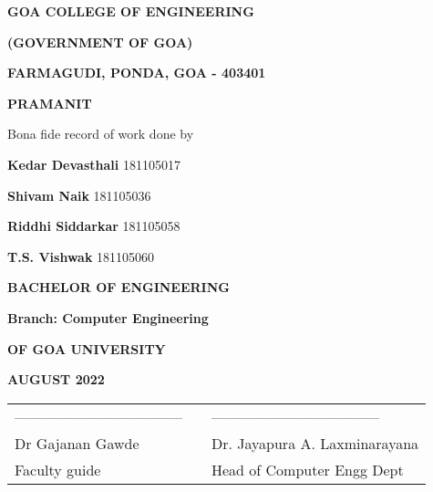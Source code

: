     \thispagestyle{empty}
    \begin{center}
        {\Large \textbf{GOA COLLEGE OF ENGINEERING} \par}
        {\textbf{(GOVERNMENT OF GOA)} \par}
        {\Large \textbf{FARMAGUDI, PONDA, GOA - 403401} \par}
    \vspace{1cm}

    {\uppercase{\Huge \textbf {PRAMANIT}}
\par}
        \vspace{1cm} {\large { Bona fide record of work done by} \par }
    \vspace{1cm}
        {\Large{ \textbf{ Kedar Devasthali } 181105017}\par }
        {\Large \textbf{ Shivam Naik }181105036 \par}
        {\Large \textbf{ Riddhi  Siddarkar }181105058 \par}
        {\Large \textbf{ T.S. Vishwak }181105060 \par}
        \vspace{0.5cm}
        
    \end{center}
        { \par }
        \begin{center}
            
        {\Large \textbf{BACHELOR OF ENGINEERING}\par}
        {\Large \textbf{Branch: Computer Engineering}\par}
        {\Large \textbf {OF GOA UNIVERSITY}\par}
        {\Large \textbf{AUGUST 2022}\par}
        \vspace{1.5cm}
        

    \end{center}
    \begin{table}[H]
        \begin{center}
    \begin{tabular}{lcl}
        \noindent ----------------------------------- &\hspace{1cm}&  ----------------------------------- \\
    Dr Gajanan Gawde & \hspace{3cm} & Dr. Jayapura A. Laxminarayana  \\
    Faculty guide        & \hspace{3cm} & Head of Computer Engg Dept    \\
    \end{tabular}
    \end{center}
\end{table}
